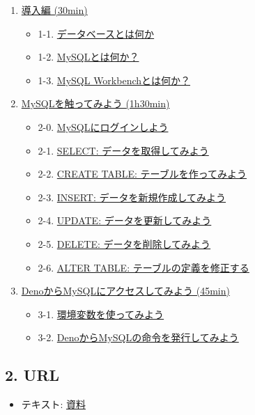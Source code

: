 \begin{enumerate}
\def\labelenumi{\arabic{enumi}.}
\tightlist
\item
  \href{./docs.md/\#1-導入編}{導入編 (30min)}

  \begin{itemize}
  \tightlist
  \item
    1-1.
    \href{./docs.md/\#1-1-データベースとは何か}{データベースとは何か}
  \item
    1-2. \href{./docs.md/\#1-2-mysqlとは何か}{MySQLとは何か？}
  \item
    1-3. \href{./docs.md/\#1-3-mysql-workbenchとは何か}{MySQL
    Workbenchとは何か？}
  \end{itemize}
\item
  \href{./docs.md/\#2-mysqlを触ってみよう}{MySQLを触ってみよう
  (1h30min)}

  \begin{itemize}
  \tightlist
  \item
    2-0.
    \href{./docs.md/\#2-0-mysqlにログインしよう}{MySQLにログインしよう}
  \item
    2-1. \href{./docs.md/\#2-1-select-データを取得してみよう}{SELECT:
    データを取得してみよう}
  \item
    2-2.
    \href{./docs.md/\#2-2-create-table-テーブルを作ってみよう}{CREATE
    TABLE: テーブルを作ってみよう}
  \item
    2-3.
    \href{./docs.md/\#2-3-insert-データを新規作成してみよう}{INSERT:
    データを新規作成してみよう}
  \item
    2-4. \href{./docs.md/\#2-4-update-データを更新してみよう}{UPDATE:
    データを更新してみよう}
  \item
    2-5. \href{./docs.md/\#2-5-delete-データを削除してみよう}{DELETE:
    データを削除してみよう}
  \item
    2-6.
    \href{./docs.md/\#2-6-alter-table-テーブルの定義を修正する}{ALTER
    TABLE: テーブルの定義を修正する}
  \end{itemize}
\item
  \href{./docs.md/\#3-denoからmysqlにアクセスしてみよう}{DenoからMySQLにアクセスしてみよう
  (45min)}

  \begin{itemize}
  \tightlist
  \item
    3-1.
    \href{./docs.md/\#3-1-環境変数を使ってみよう}{環境変数を使ってみよう}
  \item
    3-2.
    \href{./docs.md/\#3-2-denoからmysqlの命令を発行してみよう}{DenoからMySQLの命令を発行してみよう}
  \end{itemize}
\end{enumerate}

\subsection{2. URL}\label{url}

\begin{itemize}
\tightlist
\item
  テキスト: \href{./docs.md}{資料}
\end{itemize}
